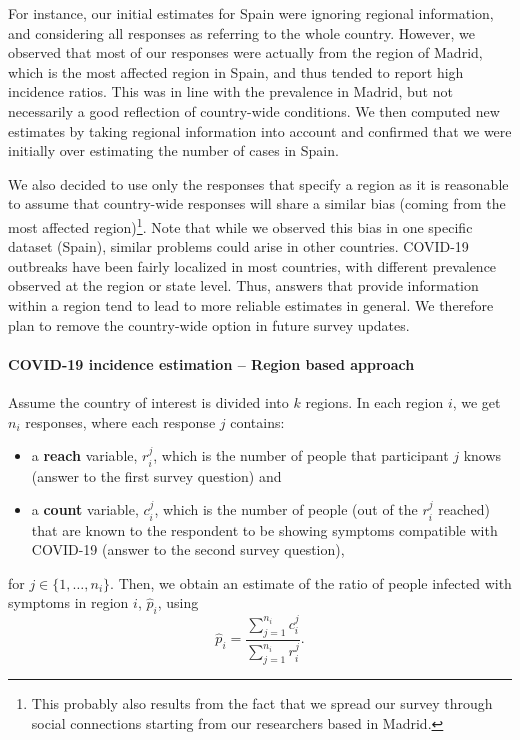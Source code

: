 \documentclass[sigconf,authordraft]{acmart}
\begin{document}
For instance, our initial estimates for Spain were ignoring regional information, and considering all responses as referring to the whole country. However, we observed that most of our responses were actually from the region of Madrid, which is the most affected region in Spain, and thus tended to report high incidence ratios. This was in line with the prevalence in Madrid, but not necessarily a good reflection of country-wide conditions. We then computed new estimates by taking regional information into account and confirmed that we were initially over estimating the number of cases in Spain. 

We also decided to use only the responses that specify a region as it is reasonable to assume that country-wide responses will share a similar bias (coming from the most affected region)\footnote{This probably also results from the fact that we spread our survey through social connections starting from our researchers based in Madrid.}. Note that while we observed this bias in one specific dataset (Spain), similar problems could arise in other countries. COVID-19 outbreaks have been fairly localized in most countries, with different prevalence observed at the region or state level. Thus, answers that provide information within a region tend to lead to more reliable estimates in general. We therefore plan to remove the country-wide option in future survey updates.

\paragraph{COVID-19 incidence estimation -- Region based approach}
Assume the country of interest is divided into $k$ regions. In each region $i$, we get $n_i$ responses, where each response $j$ contains:
\begin{itemize}
    \item a \textbf{reach} variable, $r_i^j$, which is the number of people that participant $j$ knows (answer to the first survey question) and
    \item a \textbf{count} variable, $c_i^j$, which is the number of people (out of the $r_i^j$ reached) that are known to the respondent to be showing symptoms compatible with COVID-19 (answer to the second survey question),
\end{itemize}
for $j \in \{1,\ldots,n_i\}$. Then, we obtain an estimate of the ratio of people infected with symptoms in region $i$, $\hat{p}_i$, using
$$
\hat{p}_i = \frac{\sum_{j = 1}^{n_i} c_i^j}{\sum_{j = 1}^{n_i} r_i^j}.
$$ 
\end{document}
